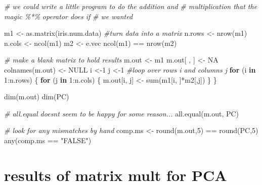 \documentclass[
]{book}
\newenvironment{Shaded}{\begin{snugshade}}{\end{snugshade}}
\newcommand{\CommentTok}[1]{\textcolor[rgb]{0.56,0.35,0.01}{\textit{#1}}}
\newcommand{\ConstantTok}[1]{\textcolor[rgb]{0.00,0.00,0.00}{#1}}
\newcommand{\ControlFlowTok}[1]{\textcolor[rgb]{0.13,0.29,0.53}{\textbf{#1}}}
\newcommand{\DecValTok}[1]{\textcolor[rgb]{0.00,0.00,0.81}{#1}}
\newcommand{\FunctionTok}[1]{\textcolor[rgb]{0.00,0.00,0.00}{#1}}
\newcommand{\NormalTok}[1]{#1}
\newcommand{\OtherTok}[1]{\textcolor[rgb]{0.56,0.35,0.01}{#1}}
\newcommand{\SpecialCharTok}[1]{\textcolor[rgb]{0.00,0.00,0.00}{#1}}
\newcommand{\StringTok}[1]{\textcolor[rgb]{0.31,0.60,0.02}{#1}}
\begin{document}
\begin{Shaded}
\begin{Highlighting}[]
\CommentTok{\# we could write a little program to do the addition and}
\CommentTok{\# multiplication that the magic \%*\% operator does if}
\CommentTok{\# we wanted}

\NormalTok{m1 }\OtherTok{\textless{}{-}} \FunctionTok{as.matrix}\NormalTok{(iris.num.data) }\CommentTok{\#turn data into a matrix}
\NormalTok{n.rows }\OtherTok{\textless{}{-}} \FunctionTok{nrow}\NormalTok{(m1)}
\NormalTok{n.cols }\OtherTok{\textless{}{-}} \FunctionTok{ncol}\NormalTok{(m1)}
\NormalTok{m2 }\OtherTok{\textless{}{-}}\NormalTok{ e.vec}
\FunctionTok{ncol}\NormalTok{(m1) }\SpecialCharTok{==} \FunctionTok{nrow}\NormalTok{(m2)}

\CommentTok{\# make a blank matrix to hold results}
\NormalTok{m.out }\OtherTok{\textless{}{-}}\NormalTok{ m1}
\NormalTok{m.out[ , ] }\OtherTok{\textless{}{-}} \ConstantTok{NA}
\FunctionTok{colnames}\NormalTok{(m.out) }\OtherTok{\textless{}{-}} \ConstantTok{NULL}
\NormalTok{i }\OtherTok{\textless{}{-}}\DecValTok{1}
\NormalTok{j }\OtherTok{\textless{}{-}}\DecValTok{1}
\CommentTok{\#loop over rows i and columns j}
\ControlFlowTok{for}\NormalTok{ (i }\ControlFlowTok{in} \DecValTok{1}\SpecialCharTok{:}\NormalTok{n.rows)}
\NormalTok{\{}
  \ControlFlowTok{for}\NormalTok{ (j }\ControlFlowTok{in} \DecValTok{1}\SpecialCharTok{:}\NormalTok{n.cols)}
\NormalTok{  \{}
\NormalTok{    m.out[i, j] }\OtherTok{\textless{}{-}} \FunctionTok{sum}\NormalTok{(m1[i, ]}\SpecialCharTok{*}\NormalTok{m2[,j])}
\NormalTok{  \}}
\NormalTok{\}}


\FunctionTok{dim}\NormalTok{(m.out)}
\FunctionTok{dim}\NormalTok{(PC)}

\CommentTok{\# all.equal doesn\textquotesingle{}t seem to be happy for some reason...}
\FunctionTok{all.equal}\NormalTok{(m.out, PC)}

\CommentTok{\# look for any mismatches by hand}
\NormalTok{comp.ms }\OtherTok{\textless{}{-}} \FunctionTok{round}\NormalTok{(m.out,}\DecValTok{5}\NormalTok{) }\SpecialCharTok{==} \FunctionTok{round}\NormalTok{(PC,}\DecValTok{5}\NormalTok{)}
\FunctionTok{any}\NormalTok{(comp.ms }\SpecialCharTok{==} \StringTok{"FALSE"}\NormalTok{)}
\end{Highlighting}
\end{Shaded}

\hypertarget{results-of-matrix-mult-for-pca}{%
\section{results of matrix mult for PCA}\label{results-of-matrix-mult-for-pca}}
\end{document}
